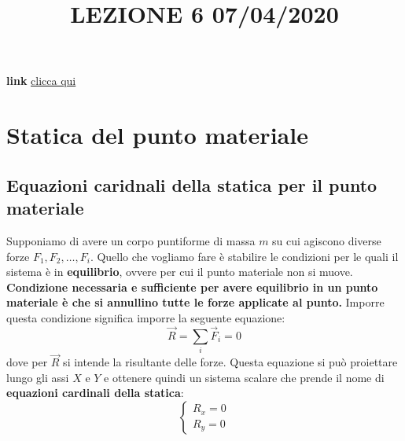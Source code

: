 \title{LEZIONE 6 07/04/2020}\newline
\textbf{link} \href{https://web.microsoftstream.com/video/47324732-47d3-4965-81ca-e0ed065beb5a}{clicca qui}
\section{Statica del punto materiale}
\subsection{Equazioni caridnali della statica per il punto materiale}
Supponiamo di avere un corpo puntiforme di massa $m$ su cui agiscono diverse forze $F_1, F_2,\dots, F_i$.\newline
\newline
Quello che vogliamo fare è stabilire le condizioni per le quali il sistema è in \textbf{equilibrio}, ovvere per cui il punto materiale non si muove.\newline
\newline
\textbf{Condizione necessaria e sufficiente per avere equilibrio in un punto materiale è che si annullino tutte le forze applicate al punto.}\newline
\newline
Imporre questa condizione significa imporre la seguente equazione:
\[
    \vec{R} = \sum_{i}\vec{F}_i = 0
\] 
dove per $\vec{R}$ si intende la risultante delle forze.\newline
Questa equazione si può proiettare lungo gli assi $X$ e $Y$ e ottenere quindi un sistema scalare che prende il nome di \textbf{equazioni cardinali della statica}:
\[
    \begin{cases}
        R_x = 0\\
        R_y = 0
    \end{cases}
\]

